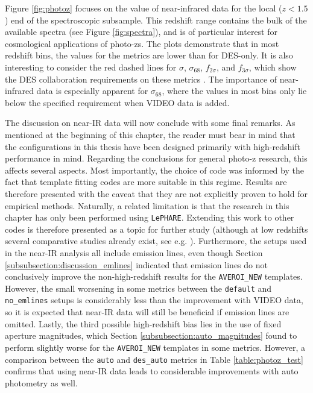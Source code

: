 Figure \ref{fig:photoz} focuses on the value of near-infrared data for the local ($z<1.5$) end of the spectroscopic subsample. This redshift range contains the bulk of the available spectra (see Figure \ref{fig:spectra}), and is of particular interest for cosmological applications of photo-zs. The plots demonstrate that in most redshift bins, the values for the \DESVIDEO metrics are lower than for DES-only. It is also interesting to consider the red dashed lines for $\sigma$, $\sigma_{68}$, $f_{2\sigma}$, and $f_{3\sigma}$, which show the DES collaboration requirements on these metrics \citep{2014MNRAS.445.1482S}. The importance of near-infrared data is especially apparent for $\sigma_{68}$, where the values in most bins only lie below the specified requirement when VIDEO data is added. \par

The discussion on near-IR data will now conclude with some final remarks. As mentioned at the beginning of this chapter, the reader must bear in mind that the configurations in this thesis have been designed primarily with high-redshift performance in mind. Regarding the conclusions for general photo-z research, this affects several aspects. Most importantly, the choice of code was informed by the fact that template fitting codes are more suitable in this regime. Results are therefore presented with the caveat that they are not explicitly proven to hold for empirical methods. Naturally, a related limitation is that the research in this chapter has only been performed using \texttt{LePHARE}. Extending this work to other codes is therefore presented as a topic for further study (although at low redshifts several comparative studies already exist, see e.g.  \citealt{2010A&A...523A..31H,2011MNRAS.417.1891A,2014MNRAS.445.1482S}). Furthermore, the setups used in the near-IR analysis all include emission lines, even though Section \ref{subsubsection:discussion_emlines} indicated that emission lines do not conclusively improve the non-high-redshift results for the \texttt{AVEROI\_NEW} templates. However, the small worsening in some metrics between the \texttt{default} and \texttt{no\_emlines} setups is considerably less than the improvement with VIDEO data, so it is expected that near-IR data will still be beneficial if emission lines are omitted. Lastly, the third possible high-redshift bias lies in the use of fixed aperture magnitudes, which Section \ref{subsubsection:auto_magnitudes} found to perform slightly worse for the \texttt{AVEROI\_NEW} templates in some metrics. However, a comparison between the \texttt{auto} and \texttt{des\_auto} metrics in Table \ref{table:photoz_test} confirms that using near-IR data leads to considerable improvements with auto photometry as well.\par

